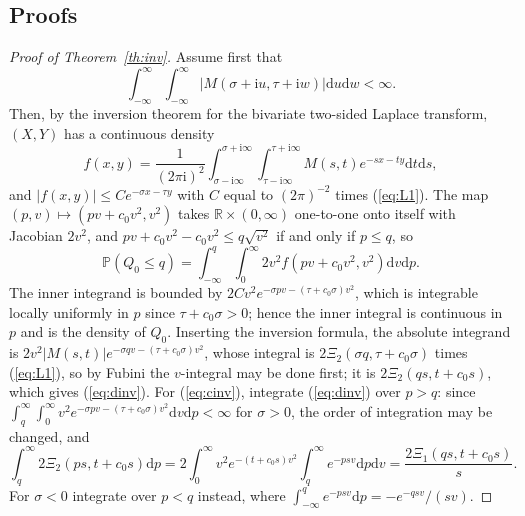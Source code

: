 \documentclass[ecta,nameyear,final]{econsocart}
\newcommand{\PP}{{\mathbb P}}
\newcommand{\dr}[1]{{\mathrm d}#1}
\newcommand{\iu}{{\mathrm i}}
\theoremstyle{plain}
\theoremstyle{definition}
\begin{document}
\begin{appendix}
\section{Proofs}
\label{app:proofs}

\begin{proof}[Proof of Theorem~\ref{th:inv}]
Assume first that
\begin{equation}
\int_{-\infty}^{\infty}\int_{-\infty}^{\infty}|M(\sigma+\iu u,\tau+\iu w)|\dr{u}\dr{w}<\infty.
\label{eq:L1}
\end{equation}
Then, by the inversion theorem for the bivariate two-sided Laplace transform, $(X,Y)$ has a continuous density
\[
f(x,y)=\frac{1}{(2\pi\iu)^2}\int_{\sigma-\iu\infty}^{\sigma+\iu\infty}\int_{\tau-\iu\infty}^{\tau+\iu\infty}M(s,t)e^{-sx-ty}\dr{t}\dr{s},
\]
and $|f(x,y)|\le Ce^{-\sigma x-\tau y}$ with $C$ equal to $(2\pi)^{-2}$ times (\ref{eq:L1}).  The map $(p,v)\mapsto(pv+c_0v^2,v^2)$ takes $\mathbb{R}\times(0,\infty)$ one-to-one onto itself with Jacobian $2v^2$, and $pv+c_0v^2-c_0v^2\le q\sqrt{v^2}$ if and only if $p\le q$, so
\[
\PP(Q_0\le q)=\int_{-\infty}^q\int_0^\infty2v^2f(pv+c_0v^2,v^2)\dr{v}\dr{p}.
\]
The inner integrand is bounded by $2Cv^2e^{-\sigma pv-(\tau+c_0\sigma)v^2}$, which is integrable locally uniformly in $p$ since $\tau+c_0\sigma>0$; hence the inner integral is continuous in $p$ and is the density of $Q_0$.  Inserting the inversion formula, the absolute integrand is $2v^2|M(s,t)|e^{-\sigma qv-(\tau+c_0\sigma)v^2}$, whose integral is $2\Xi_2(\sigma q,\tau+c_0\sigma)$ times (\ref{eq:L1}), so by Fubini the $v$-integral may be done first; it is $2\Xi_2(qs,t+c_0s)$, which gives (\ref{eq:dinv}).  For (\ref{eq:cinv}), integrate (\ref{eq:dinv}) over $p>q$: since $\int_q^\infty\int_0^\infty v^2e^{-\sigma pv-(\tau+c_0\sigma)v^2}\dr{v}\dr{p}<\infty$ for $\sigma>0$, the order of integration may be changed, and
\[
\int_q^\infty2\Xi_2(ps,t+c_0s)\dr{p}=2\int_0^\infty v^2e^{-(t+c_0s)v^2}\int_q^\infty e^{-psv}\dr{p}\dr{v}=\frac{2\Xi_1(qs,t+c_0s)}{s}.
\]
For $\sigma<0$ integrate over $p<q$ instead, where $\int_{-\infty}^qe^{-psv}\dr{p}=-e^{-qsv}/(sv)$.


\end{proof}
\end{appendix}
\end{document}
